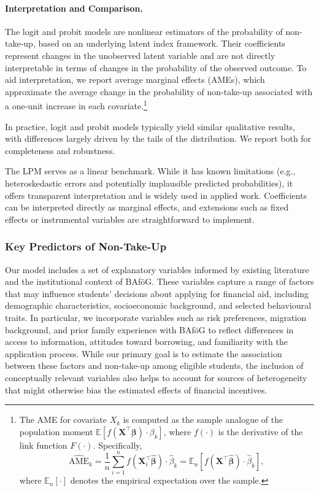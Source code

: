 \paragraph{Interpretation and Comparison.} 
The logit and probit models are nonlinear estimators of the probability of non-take-up, based on an underlying latent index framework. 
Their coefficients represent changes in the unobserved latent variable and are not directly interpretable in terms of changes in the probability of the observed outcome. 
To aid interpretation, we report average marginal effects (AMEs), which approximate the average change in the probability of non-take-up associated with a one-unit increase in each covariate.\footnote{The AME for covariate \( X_k \) is computed as the sample analogue of the population moment \( \mathbb{E}[f(\mathbf{X}^\top \boldsymbol{\beta}) \cdot \beta_k] \), where \( f(\cdot) \) is the derivative of the link function \( F(\cdot) \). Specifically,
\[
    \widehat{\text{AME}}_k 
    = \frac{1}{n} \sum_{i=1}^n f(\mathbf{X}_i^\top \hat{\boldsymbol{\beta}}) \cdot \hat{\beta}_k
    = \mathbb{E}_n \left[ f(\mathbf{X}^\top \hat{\boldsymbol{\beta}}) \cdot \hat{\beta}_k \right],
\]
where \( \mathbb{E}_n[\cdot] \) denotes the empirical expectation over the sample.}

In practice, logit and probit models typically yield similar qualitative results, with differences largely driven by the tails of the distribution. We report both for completeness and robustness.

The LPM serves as a linear benchmark. While it has known limitations (e.g., heteroskedastic errors and potentially implausible predicted probabilities), it offers transparent interpretation and is widely used in applied work. Coefficients can be interpreted directly as marginal effects, and extensions such as fixed effects or instrumental variables are straightforward to implement.


\subsubsection{Key Predictors of Non-Take-Up}
Our model includes a set of explanatory variables informed by existing literature and the institutional context of BAföG. 
These variables capture a range of factors that may influence students' decisions about applying for financial aid, including demographic characteristics, socioeconomic background, and selected behavioural traits. 
In particular, we incorporate variables such as risk preferences, migration background, and prior family experience with BAföG to reflect differences in access to information, attitudes toward borrowing, and familiarity with the application process. 
While our primary goal is to estimate the association between these factors and non-take-up among eligible students, the inclusion of conceptually relevant variables also helps to account for sources of heterogeneity that might otherwise bias the estimated effects of financial incentives.


